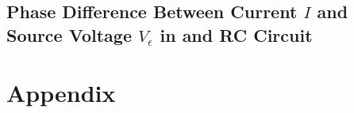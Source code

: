 \documentclass[12pt]{article}
\numberwithin{equation}{section}
\numberwithin{figure}{section}
\begin{document}
    \subsection{Phase Difference Between Current \texorpdfstring{$I$}{I} and Source Voltage \texorpdfstring{$V_\epsilon$}{Ve} in and RC Circuit}\label{sec:current}

    \newpage
    \section{Appendix}
    \setcounter{figure}{0} \renewcommand{\thefigure}{A.\arabic{figure}}
    
\end{document}
